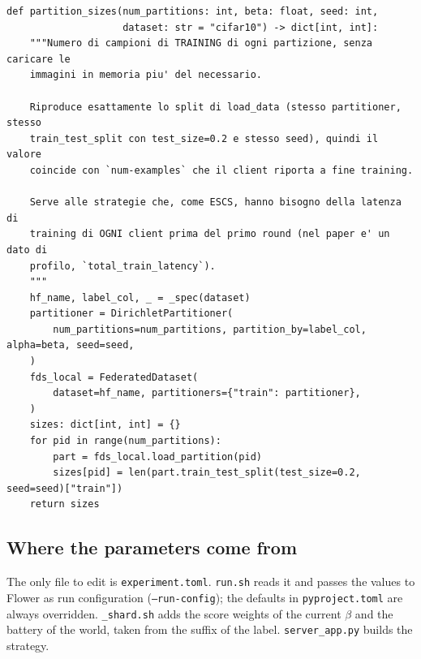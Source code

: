 \documentclass[11pt,a4paper]{article}
\newcommand{\cf}[1]{\texttt{#1}}
\begin{document}
\begin{lstlisting}[style=py,firstnumber=98,caption={\texttt{tesifl/tesiFL/data/partition.py}, lines 98--122}]
def partition_sizes(num_partitions: int, beta: float, seed: int,
                    dataset: str = "cifar10") -> dict[int, int]:
    """Numero di campioni di TRAINING di ogni partizione, senza caricare le
    immagini in memoria piu' del necessario.

    Riproduce esattamente lo split di load_data (stesso partitioner, stesso
    train_test_split con test_size=0.2 e stesso seed), quindi il valore
    coincide con `num-examples` che il client riporta a fine training.

    Serve alle strategie che, come ESCS, hanno bisogno della latenza di
    training di OGNI client prima del primo round (nel paper e' un dato di
    profilo, `total_train_latency`).
    """
    hf_name, label_col, _ = _spec(dataset)
    partitioner = DirichletPartitioner(
        num_partitions=num_partitions, partition_by=label_col, alpha=beta, seed=seed,
    )
    fds_local = FederatedDataset(
        dataset=hf_name, partitioners={"train": partitioner},
    )
    sizes: dict[int, int] = {}
    for pid in range(num_partitions):
        part = fds_local.load_partition(pid)
        sizes[pid] = len(part.train_test_split(test_size=0.2, seed=seed)["train"])
    return sizes
\end{lstlisting}

\subsection{Where the parameters come from}

The only file to edit is \cf{experiment.toml}. \cf{run.sh} reads it and passes
the values to Flower as run configuration (\cf{--run-config}); the defaults in
\cf{pyproject.toml} are always overridden. \cf{\_shard.sh} adds the score
weights of the current $\beta$ and the battery of the world, taken from the
suffix of the label. \cf{server\_app.py} builds the strategy.
\end{document}
